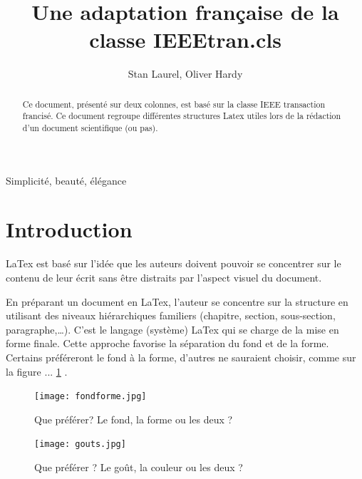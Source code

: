 \documentclass[twocolumn,a4paper]{IEEEtranfr}
\begin{document}
\title{Une adaptation française de la classe IEEEtran.cls}
\author{Stan Laurel, Oliver Hardy} 

\maketitle

\begin{abstract}
Ce document, présenté sur deux colonnes, est basé sur la classe IEEE
transaction francisé. Ce document regroupe différentes structures Latex utiles
lors de la rédaction d'un 
document scientifique (ou pas). 
\end{abstract} 

\begin{keywords}
Simplicité, beauté, élégance
\end{keywords}



\section{Introduction}

 LaTex est basé sur l'idée que les auteurs doivent pouvoir se concentrer sur le contenu de leur écrit sans être distraits par l'aspect visuel du document. 

En préparant un document en LaTex, l'auteur se concentre sur la structure en
utilisant des niveaux hiérarchiques familiers
(chapitre, section, sous-section, paragraphe,\ldots). C'est le langage
(système) LaTex qui se charge de la mise en forme finale. Cette approche favorise la séparation du
fond et de la forme. Certains préféreront le fond à la forme, d'autres ne
sauraient choisir, comme sur la figure ... \ref{fig:fondforme} . 

\begin{figure}[htpb]
  \begin{center}
    \texttt{[image: fondforme.jpg]}
  \end{center}
  \caption{Que préférer?  Le fond, la forme ou les deux ? }
  \label{fig:fondforme}
\end{figure}

\begin{figure}[htpb]
  \begin{center}
    \texttt{[image: gouts.jpg]}
  \end{center}
  \caption{Que préférer ? Le goût, la couleur ou les deux ?  }
  \label{fig:gouts}
\end{figure}
\end{document}
